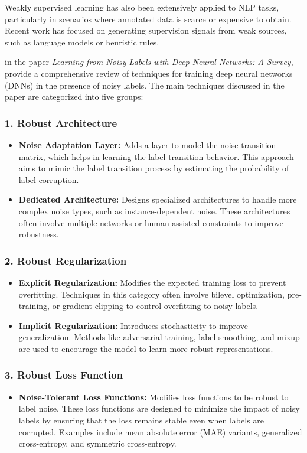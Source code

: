 Weakly supervised learning has also been extensively applied to NLP tasks, particularly in scenarios where annotated data is scarce or expensive to obtain. Recent work has focused on generating supervision signals from weak sources, such as language models or heuristic rules.
\newline

\citet{song_learning_2022} in the paper \emph{Learning from Noisy Labels with Deep Neural Networks: A Survey}, provide a comprehensive review of techniques for training deep neural networks (DNNs) in the presence of noisy labels. The main techniques discussed in the paper are categorized into five groups:

\subsubsection*{1. Robust Architecture}
\begin{itemize}
    \item \textbf{Noise Adaptation Layer:} Adds a layer to model the noise transition matrix, which helps in learning the label transition behavior. This approach aims to mimic the label transition process by estimating the probability of label corruption.
    \item \textbf{Dedicated Architecture:} Designs specialized architectures to handle more complex noise types, such as instance-dependent noise. These architectures often involve multiple networks or human-assisted constraints to improve robustness.
\end{itemize}

\subsubsection*{2. Robust Regularization}
\begin{itemize}
    \item \textbf{Explicit Regularization:} Modifies the expected training loss to prevent overfitting. Techniques in this category often involve bilevel optimization, pre-training, or gradient clipping to control overfitting to noisy labels.
    \item \textbf{Implicit Regularization:} Introduces stochasticity to improve generalization. Methods like adversarial training, label smoothing, and mixup are used to encourage the model to learn more robust representations.
\end{itemize}

\subsubsection*{3. Robust Loss Function}
\begin{itemize}
    \item \textbf{Noise-Tolerant Loss Functions:} Modifies loss functions to be robust to label noise. These loss functions are designed to minimize the impact of noisy labels by ensuring that the loss remains stable even when labels are corrupted. Examples include mean absolute error (MAE) variants, generalized cross-entropy, and symmetric cross-entropy.
\end{itemize}

